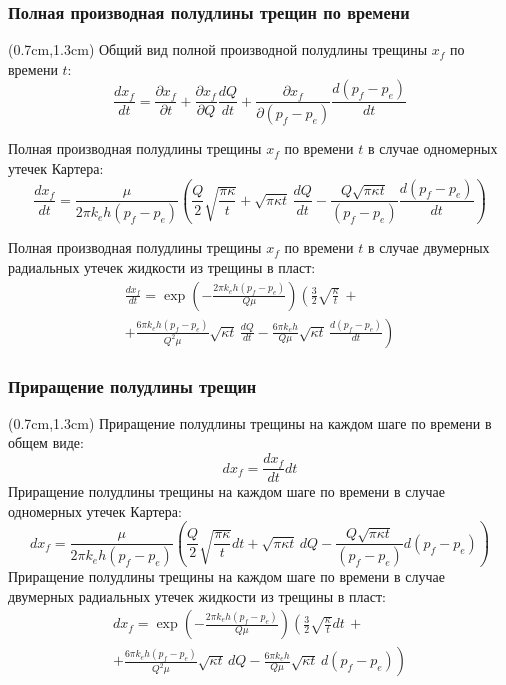 \documentclass{beamer}
\begin{document}
\begin{frame}
\frametitle{Полная производная полудлины трещин по времени}
\small
\begin{textblock*}{11cm}(0.7cm,1.3cm)
Общий вид полной производной полудлины трещины $x_{\!f}$ по времени $t$:
$$
\frac{dx_{\!f}}{dt}=\frac{\partial x_{\!f}}{\partial t}+\frac{\partial x_{\!f}}{\partial Q}\frac{dQ}{dt}+\frac{\partial x_{\!f}}{\partial (p_{\!f}-p_e)}\frac{d(p_{\!f}-p_e)}{dt}
$$

Полная производная полудлины трещины $x_{\!f}$ по времени $t$ в случае одномерных утечек Картера:
$$
\frac{dx_{\!f}}{dt}=\frac{\mu}{2\pi k_e h(p_{\!f}-p_e)}\left(\frac{Q}{2}\sqrt{\frac{\pi\kappa}{t}}+\sqrt{\pi\kappa t}\,\frac{dQ}{dt}-\frac{Q\sqrt{\pi\kappa t}}{\left(p_{\!f}-p_e\right)}\frac{d(p_{\!f}-p_e)}{dt}\right)
$$

Полная производная полудлины трещины $x_{\!f}$ по времени $t$ в случае двумерных радиальных утечек жидкости из трещины в пласт:
$$
\begin{gathered}
\frac{dx_{\!f}}{dt}=\exp{\!\left(-\frac{2\pi k_e h\left(p_{\!f}-p_e\right)}{Q\mu}\right)}\left(\frac{3}{2}\sqrt{\frac{\kappa}{t}}\,+\right.\\[10pt]
+\left.\frac{6\pi k_e h\left(p_{\!f}-p_e\right)}{Q^2\mu}\sqrt{\kappa t}\,\frac{dQ}{dt}-\frac{6\pi k_e h}{Q\mu}\sqrt{\kappa t}\,\frac{d(p_{\!f}-p_e)}{dt}\right)
\end{gathered}
$$
\end{textblock*}
\end{frame}


\begin{frame}
\frametitle{Приращение полудлины трещин}
\small
\begin{textblock*}{11cm}(0.7cm,1.3cm)
Приращение полудлины трещины на каждом шаге по времени в общем виде:
$$
dx_{\!f}=\frac{dx_{\!f}}{dt}dt
$$
Приращение полудлины трещины на каждом шаге по времени в случае одномерных утечек Картера:
$$
dx_{\!f}=\frac{\mu}{2\pi k_e h(p_{\!f}-p_e)}\left(\frac{Q}{2}\sqrt{\frac{\pi\kappa}{t}}dt+\sqrt{\pi\kappa t}\,dQ-\frac{Q\sqrt{\pi\kappa t}}{\left(p_{\!f}-p_e\right)}d(p_{\!f}-p_e)\right)
$$
Приращение полудлины трещины на каждом шаге по времени в случае двумерных радиальных утечек жидкости из трещины в пласт:
$$
\begin{gathered}
dx_{\!f}=\exp{\!\left(-\frac{2\pi k_e h\left(p_{\!f}-p_e\right)}{Q\mu}\right)}\left(\frac{3}{2}\sqrt{\frac{\kappa}{t}}dt\,+\right.\\[10pt]
+\left.\frac{6\pi k_e h\left(p_{\!f}-p_e\right)}{Q^2\mu}\sqrt{\kappa t}\,dQ-\frac{6\pi k_e h}{Q\mu}\sqrt{\kappa t}\,d(p_{\!f}-p_e)\right)
\end{gathered}
$$
\end{textblock*}
\normalsize

\end{frame}
\end{document}
